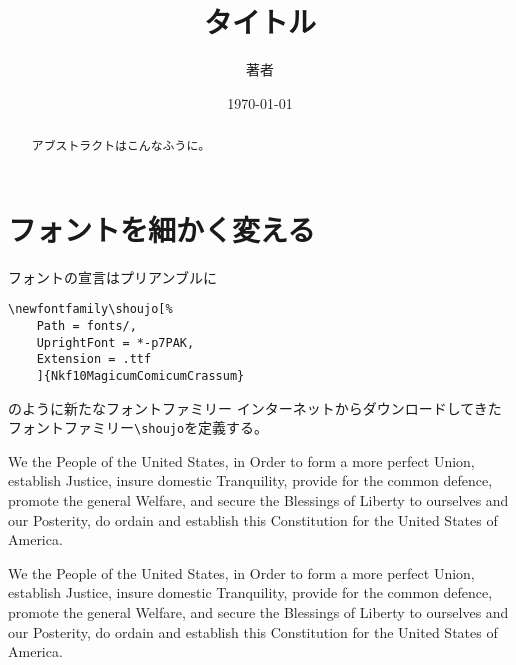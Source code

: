 \documentclass{ltjsarticle}
\author{著者}
\date{\和暦\today}
\title{タイトル}
\begin{document}
\maketitle
\tableofcontents
%
\begin{abstract}
    アブストラクトはこんなふうに。
\end{abstract}
%
%
\section{フォントを細かく変える}
フォントの宣言はプリアンブルに
\begin{verbatim}
\newfontfamily\shoujo[%
    Path = fonts/,
    UprightFont = *-p7PAK,
    Extension = .ttf
    ]{Nkf10MagicumComicumCrassum}
\end{verbatim}
のように新たなフォントファミリー
インターネットからダウンロードしてきたフォントファミリー\verb|\shoujo|を定義する。

{\shoujo We the People of the United States, in Order to form a more perfect Union, establish Justice, insure domestic Tranquility, provide for the common defence, promote the general Welfare, and secure the Blessings of Liberty to ourselves and our Posterity, do ordain and establish this Constitution for the United States of America.}

We the People of the United States, in Order to form a more perfect Union, establish Justice, insure domestic Tranquility, provide for the common defence, promote the general Welfare, and secure the Blessings of Liberty to ourselves and our Posterity, do ordain and establish this Constitution for the United States of America.
%


\end{document}

